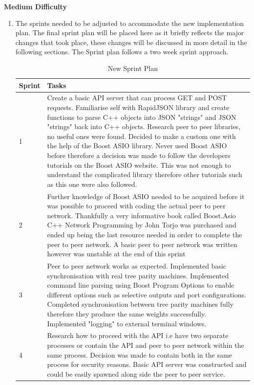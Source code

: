 \textbf{Medium Difficulty}
\begin{enumerate}
\item The sprints needed to be adjusted to accommodate the new implementation plan. The final sprint plan will be placed here as it briefly reflects the major changes that took place, these changes will be discussed in more detail in the following sections. The Sprint plan follows a two week sprint approach.
\begin{table}[h]
\centering
\caption{New Sprint Plan}
\begin{tabular}{|p{1cm}|p{12cm}|}
\hline Sprint & Tasks \\ [14pt]

\hline 1 & Create a basic API server that can process GET and POST requests. Familiarise self with RapidJSON library \cite{rapidjson} and create functions to parse C++ objects into JSON "strings" and JSON "strings" back into C++ objects. Research peer to peer libraries, no useful ones were found. Decided to make a custom one with the help of the Boost ASIO \cite{boost_asio_home} library. Never used Boost ASIO before therefore a decision was made to follow the developers tutorials on the Boost ASIO website. This was not enough to understand the complicated library therefore other tutorials such as this one \cite{boost_asio_totorial_1} were also followed.  \\ [12pt]

\hline 2 & Further knowledge of Boost ASIO needed to be acquired before it was possible to proceed with coding the actual peer to peer network. Thankfully a very informative book called Boost.Asio C++ Network Programming \cite{boost_book} by John Torjo was purchased and ended up being the last resource needed in order to complete the peer to peer network. A basic peer to peer network was written however was unstable at the end of this sprint \\ [12pt]

\hline 3 & Peer to peer network works as expected. Implemented basic synchronisation with real tree parity machines. Implemented command line parsing using Boost Program Options \cite{boost_asio_cmd} to enable different options such as selective outputs and port configurations. Completed synchronisation between tree parity machines fully therefore they produce the same weights successfully. Implemented "logging" to external terminal windows. \\ [12pt]

\hline 4 & Research how to proceed with the API i.e have two separate processes or contain the API and peer to peer network within the same process. Decision was made to contain both in the same process for security reasons. Basic API server was constructed and could be easily spawned along side the peer to peer service.\\ [12pt]


\end{tabular}
\end{table}
\end{enumerate}
